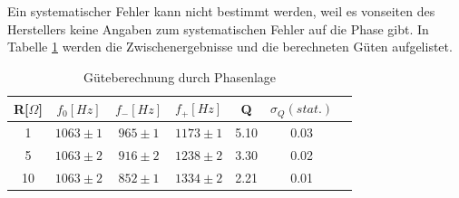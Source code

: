 \documentclass[12pt,a4paper]{article}
\begin{document}
Ein systematischer Fehler kann nicht bestimmt werden, weil es vonseiten des Herstellers keine Angaben zum systematischen Fehler auf die Phase gibt. In Tabelle \ref{table:S_phi} werden die Zwischenergebnisse und die berechneten Güten aufgelistet.
\begin{table}[H]
	\centering
	\begin{tabular}{|c|c|c|c|c|c|c|}
		\hline
		R[$\Omega$]&$f_0[Hz]$&$f_-[Hz]$&$f_+[Hz]$&Q&$\sigma_Q(stat.)$\\
		\hline
		1&$1063\pm1$&$965\pm1$&$1173\pm1$&5.10&0.03\\
		5&$1063\pm2$&$916\pm2$&$1238\pm2$&3.30&0.02\\
		10&$1063\pm2$&$852\pm1$&$1334\pm2$&2.21&0.01\\
		\hline		
	\end{tabular}
	\caption{Güteberechnung durch Phasenlage}
	\label{table:S_phi}
\end{table}
\end{document}
